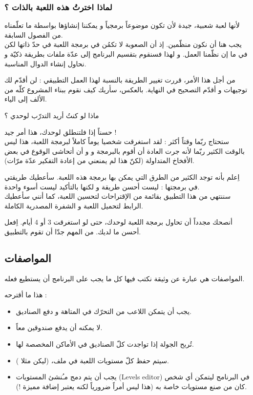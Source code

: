 \subsubsection{لماذا اخترتُ هذه اللعبة بالذات ؟}

لأنها لعبة شعبية، جيدة لأن تكون موضوعاً برمجياً و يمكننا إنشاؤها بواسطة ما تعلّمناه من الفصول السابقة.\\
يجب هنا أن نكون منظّمين. إذ أن الصعوبة لا تكمُن في برمجة اللعبة في حدّ ذاتها لكن في ما إن نظّمنا العمل. و لهذا فسنقوم بتقسيم البرنامج إلى عدّة ملفات
بطريقة ذكيّة و نحاول إنشاء الدوال المناسبة.

من أجل هذا الأمر، قررت تغيير الطريقة بالنسبة لهذا العمل  التطبيقي : لن أقدّم لك توجيهات و أقدّم التصحيح في النهاية. بالعكس، سأريك كيف نقوم ببناء المشروع كلّه من الألف إلى الياء.

\begin{question}
ماذا لو كنتُ أريد التدرّب لوحدي ؟
\end{question}

حسناً إذا فلتنطلق لوحدك، هذا أمر جيد !\\
ستحتاج ربّما وقتاً أكثر : لقد استغرقت شخصيا يوماً كاملاً لبرمجة اللعبة، هذا ليس بالوقت الكثير ربّما لأنه جرت العادة أن أقوم بالبرمجة و و أن أتحاشى الوقوع في بعض الأفخاخ المتداولة (لكنّ هذا لم يمنعني من إعادة التفكير عدّة مرّات).

اِعلم بأنه توجد الكثير من الطرق التي يمكن بها برمجة هذه اللعبة. سأعطيك طريقتي في برمجتها : ليست أحسن طريقة و لكنها بالتأكيد ليست أسوء واحدة.\\
سننتهي من هذا التطبيق بقائمة من الإقتراحات لتحسين اللعبة، كما أنني سأعطيك الرابط لتحميل اللعبة و الشفرة المصدرية الكاملة.

أنصحك مجدداً أن تحاول برمجة اللعبة لوحدك، حتى لو استغرقت 3 أو 4 أيام. اِفعل أحسن ما لديك. من المهم جدّا أن تقوم بالتطبيق.

\subsection{المواصفات}

المواصفات هي عبارة عن وثيقة نكتب فيها كل ما يجب على البرنامج أن يستطيع فعله.

هذا ما أقترحه :

\begin{itemize}
	\item يجب أن يتمكن اللاعب من التحرّك في المتاهة و دفع الصناديق.
	\item لا يمكنه أن يدفع صندوقين معاً.
	\item تُربح الجولة إذا تواجدت كلّ الصناديق في الأماكن المخصصة لها.
	\item سيتم حفظ كلّ مستويات اللعبة في ملف، (ليكن مثلا 
	).
	\item يجب أن يتم دمج مـُنشئ المستويات 
	(\textenglish{Levels editor})
	في البرنامج ليتمكن أي شخص كان من صنع مستويات خاصة به (هذا ليس أمراً ضرورياً لكنه يعتبر إضافة مميزة !).
\end{itemize}

